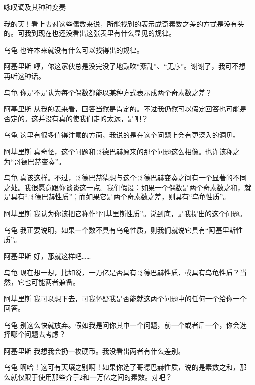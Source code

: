 \begin{dialog}{咏叹调及其种种变奏}
\begin{dialogue}
我的天！看上去对这些偶数来说，所能找到的表示成奇素数之差的方式是没有头的。可我到现在也还没看出这张表里有什么显见的规律。

\item[乌龟]也许本来就没有什么可以找得出的规律。

\item[阿基里斯]哼，你这家伙总是没完没了地鼓吹“紊乱”、“无序”。谢谢了，我可不想再听这种话。

\item[乌龟]你是不是认为每个偶数都能以某种方式表示成两个奇素数之差？

\item[阿基里斯]从我的表来看，回答当然是肯定的。不过我仍然可以假定回答也可能是否定的。这并没有真的使我们走的太远，是吧？

\item[乌龟]这里有很多值得注意的方面，我说的是在这个问题上会有更深入的洞见。

\item[阿基里斯]真奇怪，这个问题和哥德巴赫原来的那个问题这么相像。也许该称之为“哥德巴赫变奏”。

\item[乌龟]真该这样。不过，哥德巴赫猜想与这个哥德巴赫变奏之间有一个显著的不同之处。我很愿意跟你谈谈这一点。我们假设：如果一个偶数是两个奇素数之和，就是具有“哥德巴赫性质”；而如果它是两个奇素数之差，则具有“乌龟性质”。

\item[阿基里斯]我认为你该把它称作“阿基里斯性质”。说到底，是我提出的这个问题。

\item[乌龟]我正要说明，如果一个数不具有乌龟性质，则我们就说它具有“阿基里斯性质”。

\item[阿基里斯]好，那就这样吧……

\item[乌龟]现在想一想，比如说，一万亿是否具有哥德巴赫性质，或具有乌龟性质？当然，它也可能两者兼备。

\item[阿基里斯]我可以想下去，可我怀疑我是否能就这两个问题中的任何一个给你一个回答。

\item[乌龟]别这么快就放弃。假如我是问你其中一个问题，前一个或者后一个，你会选择哪个问题去考虑？

\item[阿基里斯]我想我会扔一枚硬币。我没看出两者有什么差别。

\item[乌龟]啊哈！这可有天壤之别啊！如果你选了哥德巴赫性质，说的是素数之和，那么就仅限于使用那些介于$2$和一万亿之间的素数。对吧？


\end{dialogue}
\end{dialog}
